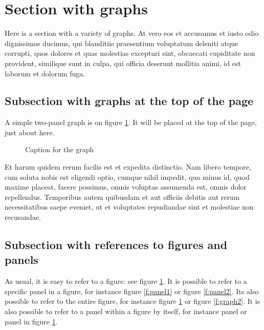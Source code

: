 \documentclass[letterpaper,12pt,leqno]{article}
\newcommand{\pdf}{figures.pdf}
\begin{document}
\section{Section with graphs}\label{s:graphs}

Here is a section with a variety of graphs. At vero eos et accusamus et iusto odio dignissimos ducimus, qui blanditiis praesentium voluptatum deleniti atque corrupti, quos dolores et quas molestias excepturi sint, obcaecati cupiditate non provident, similique sunt in culpa, qui officia deserunt mollitia animi, id est laborum et dolorum fuga. 

\subsection{Subsection with graphs at the top of the page}

A simple two-panel graph is on figure \ref{f:graph1}. It will be placed at the top of the page, just about here.

\begin{figure}[t]
\hfill
{}
\caption{Caption for the graph}
\label{f:graph1}\end{figure}

Et harum quidem rerum facilis est et expedita distinctio. Nam libero tempore, cum soluta nobis est eligendi optio, cumque nihil impedit, quo minus id, quod maxime placeat, facere possimus, omnis voluptas assumenda est, omnis dolor repellendus. Temporibus autem quibusdam et aut officiis debitis aut rerum necessitatibus saepe eveniet, ut et voluptates repudiandae sint et molestiae non recusandae. 

\subsection{Subsection with references to figures and panels} 

As usual, it is easy to refer to a figure: see figure \ref{f:graph1}. It is possible to refer to a specific panel in a figure, for instance figure \ref{f:panel1} or figure \ref{f:panel2}. Its also possible to refer to the entire figure, for instance figure \ref{f:graph1} or figure \ref{f:graph2}. It is also possible to refer to a panel within a figure by itself, for instance panel  or panel  in figure \ref{f:graph1}.
\end{document}
